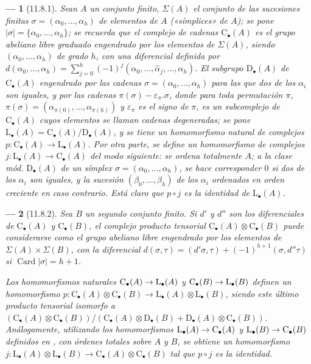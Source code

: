 \documentclass[10pt,oneside,openany]{book}
\theoremstyle{egaenv}\newtheorem*{env}{---}
\theoremstyle{egastatement}
\theoremstyle{egadescription}
\renewcommand{\to}{\mathchoice{\longrightarrow}{\rightarrow}{\rightarrow}{\rightarrow}}
\begin{document}
\begin{env}[11.8.1]
\label{0.11.8.1-fr}
Sean $A$ un conjunto finito, $\Sigma(A)$ el conjunto de las sucesiones finitas $\sigma=(\alpha_0,\ldots,\alpha_h)$ de elementos de $A$ («símplices» de $A$); se pone $|\sigma|=\{\alpha_0,\ldots,\alpha_h\}$; se recuerda que el complejo de cadenas $\mathrm C_\bullet(A)$ es el grupo abeliano libre graduado engendrado por los elementos de $\Sigma(A)$, siendo $(\alpha_0,\ldots,\alpha_h)$ de \emph{grado} $h$, con una diferencial definida por $d(\alpha_0,\ldots,\alpha_h)=\sum_{j=0}^{h}(-1)^j(\alpha_0,\ldots,\widehat{\alpha}_j,\ldots,\alpha_h)$. El subgrupo $\mathrm D_\bullet(A)$ de $\mathrm C_\bullet(A)$ engendrado por las cadenas $\sigma=(\alpha_0,\ldots,\alpha_h)$ para las que dos de los $\alpha_i$ son iguales, y por las cadenas $\pi(\sigma)-\varepsilon_\pi.\sigma$, donde para toda permutación $\pi$, $\pi(\sigma)=(\alpha_{\pi(0)},\ldots,\alpha_{\pi(h)})$ y $\varepsilon_\pi$ es el signo de $\pi$, es un subcomplejo de $\mathrm C_\bullet(A)$ cuyos elementos se llaman cadenas \emph{degeneradas}; se pone $\mathrm L_\bullet(A)=\mathrm C_\bullet(A)/\mathrm D_\bullet(A)$, y se tiene un homomorfismo natural de complejos $p:\mathrm C_\bullet(A)\longrightarrow\mathrm L_\bullet(A)$. Por otra parte, se define un homomorfismo de complejos $j:\mathrm L_\bullet(A)\longrightarrow\mathrm C_\bullet(A)$ del modo siguiente: se ordena totalmente $A$; a la clase mód. $\mathrm D_\bullet(A)$ de un símplex $\sigma=(\alpha_0,\ldots,\alpha_h)$, se hace corresponder $0$ si dos de los $\alpha_i$ son iguales, y la sucesión $(\beta_0,\ldots,\beta_h)$ de los $\alpha_i$ ordenados \emph{en orden creciente} en caso contrario. Está claro que $p\circ
j$ es la \emph{identidad} de $\mathrm L_\bullet(A)$.
\end{env}

\begin{env}[11.8.2]
\label{0.11.8.2}
\label{0.11.8.2-fr}
Sea $B$ un segundo conjunto finito.
Si $d'$ y $d''$ son los diferenciales de
$\mathrm C_\bullet(A)$ y $\mathrm C_\bullet(B)$, el complejo producto
tensorial
$\mathrm C_\bullet(A)\otimes\mathrm C_\bullet(B)$
puede considerarse como el grupo abeliano libre engendrado por los elementos de
$\Sigma(A)\times\Sigma(B)$, con la diferencial
$d(\sigma,\tau)=(d'\sigma,\tau)+(-1)^{h+1}(\sigma,d''\tau)$ si $\operatorname{Card}|\sigma|=h+1$.

Los homomorfismos naturales
$\mathrm C_\bullet(A)\to\mathrm L_\bullet(A)$ y
$\mathrm C_\bullet(B)\to\mathrm L_\bullet(B)$ definen un homomorfismo
$p:\mathrm C_\bullet(A)\otimes\mathrm C_\bullet(B)\longrightarrow\mathrm L_\bullet(A)\otimes\mathrm L_\bullet(B)$,
siendo este último producto tensorial isomorfo a
$(\mathrm C_\bullet(A)\otimes\mathrm C_\bullet(B))/(\mathrm C_\bullet(A)\otimes\mathrm D_\bullet(B)+\mathrm D_\bullet(A)\otimes\mathrm C_\bullet(B))$.
Análogamente, utilizando los homomorfismos
$\mathrm L_\bullet(A)\to\mathrm C_\bullet(A)$ y
$\mathrm L_\bullet(B)\to\mathrm C_\bullet(B)$ definidos en
, con órdenes totales sobre $A$ y $B$, se obtiene un
homomorfismo
$j:\mathrm L_\bullet(A)\otimes\mathrm L_\bullet(B)\longrightarrow\mathrm C_\bullet(A)\otimes\mathrm C_\bullet(B)$
tal que $p\circ j$ es la identidad.
\end{env}
\end{document}
